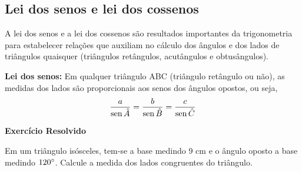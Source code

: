 \subsection{Lei dos senos e lei dos cossenos}

 A lei dos senos e a lei dos cossenos são resultados importantes da trigonometria para estabelecer relações que auxiliam no cálculo dos ângulos e dos lados de triângulos quaisquer (triângulos retângulos, acutângulos e obtusângulos).

\noindent
 \textbf{Lei dos senos:} Em qualquer triângulo ABC (triângulo retângulo ou não), as medidas dos lados são proporcionais aos senos dos ângulos opostos, ou seja,
 $$\displaystyle\frac{a}{\operatorname{sen} \hat{A}} = \displaystyle\frac{b}{\operatorname{sen} \hat{B}} = \displaystyle\frac{c}{\operatorname{sen} \hat{C}}$$

\noindent
\textbf{Exercício Resolvido}

Em um triângulo isósceles, tem-se a base medindo 9 cm e o ângulo oposto a base medindo $120 \degree$. Calcule a medida dos lados congruentes do triângulo.\\

